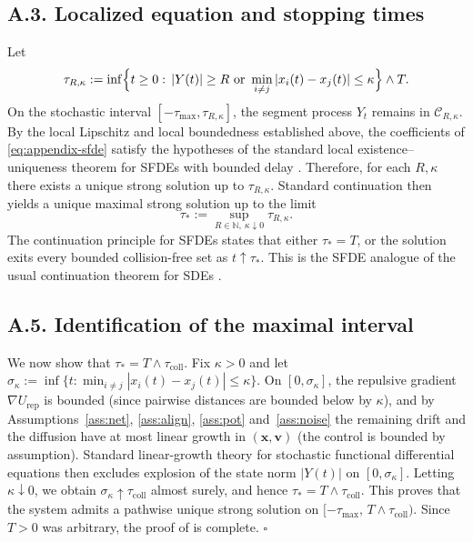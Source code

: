\documentclass[pdflatex,sn-mathphys-num]{sn-jnl}%
\numberwithin{equation}{section}
\theoremstyle{thmstyleone}%
\theoremstyle{remark}
\theoremstyle{definition}
\begin{document}
\subsection*{A.3. Localized equation and stopping times}
Let
\begin{equation*}
\begin{aligned}
  \tau_{R,\kappa}  := \inf\Bigl\{ t\ge 0:\, |Y(t)|\ge R \ \text{or} \
  \min_{i\neq j}|x_i(t)-x_j(t)|\le \kappa \Bigr\} \wedge T.
\end{aligned}
\end{equation*}
On the stochastic interval $[-\tau_{\max},\tau_{R,\kappa}]$, the segment
process $Y_t$ remains in $\mathcal C_{R,\kappa}$. By the local Lipschitz
and local boundedness established above, the coefficients of
\eqref{eq:appendix-sfde} satisfy the hypotheses of the standard local
existence--uniqueness theorem for SFDEs with bounded delay
\cite{mohammed1984stochastic,mao2007stochastic,von2010existence}. Therefore, for
each $R,\kappa$ there exists a unique strong solution up to
$\tau_{R,\kappa}$. Standard continuation then yields a unique maximal
strong solution up to the limit
\[
  \tau_\ast
  :=
  \sup_{R\in\mathbb N,\ \kappa\downarrow 0}\tau_{R,\kappa}.
\]
The continuation principle for SFDEs states that either $\tau_\ast=T$, or
the solution exits every bounded collision-free set as
$t\uparrow\tau_\ast$. This is the SFDE analogue of the usual continuation
theorem for SDEs
\cite{von2010existence,mao2007stochastic,mohammed1984stochastic}.
\subsection*{A.5. Identification of the maximal interval}
We now show that $\tau_\ast = T\wedge \tau_{\mathrm{coll}}$. Fix
$\kappa>0$ and let $\sigma_\kappa := \inf\{t:\min_{i\neq j}|x_i(t)-x_j(t)|\le\kappa\}$.
On $[0,\sigma_\kappa]$, the repulsive gradient $\nabla U_{\mathrm{rep}}$ is
bounded (since pairwise distances are bounded below by $\kappa$), and by Assumptions~\ref{ass:net}, \ref{ass:align}, \ref{ass:pot} and~\ref{ass:noise} the remaining drift and the
diffusion have at most linear growth in $(\mathbf{x},\mathbf{v})$ (the control is
bounded by assumption). Standard linear-growth theory for stochastic
functional differential equations \cite{mao2007stochastic}
then excludes explosion of the state norm $|Y(t)|$ on $[0,\sigma_\kappa]$.
Letting $\kappa\downarrow 0$, we obtain $\sigma_\kappa\uparrow\tau_{\mathrm{coll}}$
almost surely, and hence $\tau_\ast=T\wedge\tau_{\mathrm{coll}}$. This
proves that the system admits a pathwise unique strong solution on
$[-\tau_{\max},\,T\wedge\tau_{\mathrm{coll}})$.
Since $T>0$ was arbitrary, the proof of  is complete.
\hfill$\square$
\end{document}

